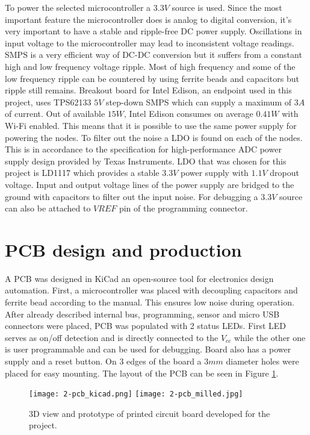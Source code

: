 To power the selected microcontroller a $3.3V$ source is used. Since the most important feature the microcontroller does is analog to digital conversion, it's very important to have a stable and ripple-free \ac{DC} power supply. Oscillations in input voltage to the microcontroller may lead to inconsistent voltage readings. \ac{SMPS} is a very efficient way of \ac{DC}-\ac{DC} conversion but it suffers from a constant high and low frequency voltage ripple. Most of high frequency and some of the low frequency ripple can be countered by using ferrite beads and capacitors but ripple still remains. Breakout board for Intel Edison, an endpoint used in this project, uses TPS62133 $5V$ step-down \ac{SMPS} which can supply a maximum of $3A$ of current\cite{edison_breakout}\cite{TPS6213}. Out of available $15W$, Intel Edison consumes on average $0.41W$ with Wi-Fi enabled. This means that it is possible to use the same power supply for powering the nodes. To filter out the noise a \ac{LDO} is found on each of the nodes. This is in accordance to the specification for high-performance \ac{ADC} power supply design provided by Texas Instruments\cite{SMPS}. \ac{LDO} that was chosen for this project is LD1117 which provides a stable $3.3V$ power supply with $1.1V$ dropout voltage. Input and output voltage lines of the power supply are bridged to the ground with capacitors to filter out the input noise. For debugging a $3.3V$ source can also be attached to ${VREF}$ pin of the programming connector.


\section{PCB design and production}

A \ac{PCB} was designed in KiCad an open-source tool for electronics design automation. First, a microcontroller was placed with decoupling capacitors and ferrite bead according to the manual\cite{ATSAMD}. This ensures low noise during operation. After already described internal bus, programming, sensor and  micro USB connectors were placed, \ac{PCB} was populated with 2 status \ac{LED}s. First \ac{LED} serves as on/off detection and is directly connected to the $V_{cc}$ while the other one is user programmable and can be used for debugging. Board also has a power supply and a reset button. On 3 edges of the board a $3mm$ diameter holes were placed for easy mounting. The layout of the \ac{PCB} can be seen in Figure \ref{fig:pcb_kicad}.

\begin{figure}[h]
  \begin{center}
    \texttt{[image: 2-pcb\_kicad.png]}
    \hspace{1cm}
    \texttt{[image: 2-pcb\_milled.jpg]}
  \end{center}
  \caption{3D view and prototype of printed circuit board developed for the project.}
  \label{fig:pcb_kicad}
\end{figure}

